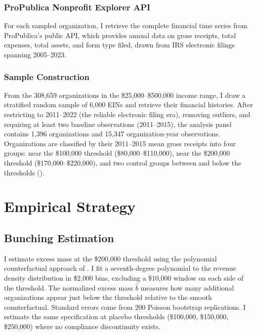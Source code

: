 \documentclass[12pt]{article}
\begin{document}
\subsubsection*{ProPublica Nonprofit Explorer API} For each sampled organization, I retrieve the complete financial time series from ProPublica's public API, which provides annual data on gross receipts, total expenses, total assets, and form type filed, drawn from IRS electronic filings spanning 2005--2023.

\subsubsection*{Sample Construction} From the 308,659 organizations in the \$25,000--\$500,000 income range, I draw a stratified random sample of 6,000 EINs and retrieve their financial histories. After restricting to 2011--2022 (the reliable electronic filing era), removing outliers, and requiring at least two baseline observations (2011--2015), the analysis panel contains 1,396 organizations and 15,347 organization-year observations. Organizations are classified by their 2011--2015 mean gross receipts into four groups: near the \$100,000 threshold (\$80,000--\$110,000), near the \$200,000 threshold (\$170,000--\$220,000), and two control groups between and below the thresholds ().

{\small}


\section{Empirical Strategy}
\label{sec:strategy}

\subsection{Bunching Estimation}

I estimate excess mass at the \$200,000 threshold using the polynomial counterfactual approach of \citet{kleven2016bunching}. I fit a seventh-degree polynomial to the revenue density distribution in \$2,000 bins, excluding a \$10,000 window on each side of the threshold. The normalized excess mass $\hat{b}$ measures how many additional organizations appear just below the threshold relative to the smooth counterfactual. Standard errors come from 200 Poisson bootstrap replications. I estimate the same specification at placebo thresholds (\$100,000, \$150,000, \$250,000) where no compliance discontinuity exists.
\end{document}
